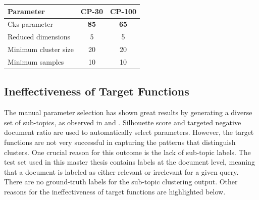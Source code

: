  \begin{center}
 	\label{tab:manual_parameter_selection}
 	\begin{tabularx}{.5\textwidth}{|Y|c|c|}
 		\hline
 		Parameter & CP-30 & CP-100 \\
 		\hline
 		
 		Cks parameter & \textbf{85} &         \textbf{65} \\ \hline
 		Reduced dimensions &  5  &       5 \\ \hline
 		Minimum cluster size & 20 &         20 \\ \hline
 		Minimum samples &    10  &     10 \\ \hline
 		
 	\end{tabularx}
 	
 \end{center}
 
 \subsection{Ineffectiveness of Target Functions}
 
The manual parameter selection has shown great results by generating a diverse set of sub-topics, as observed in  and . Silhouette score and targeted negative document ratio are used to automatically select parameters. However, the target functions are not very successful in capturing the patterns that distinguish clusters. One crucial reason for this outcome is the lack of sub-topic labels. The test set used in this master thesis contains labels at the document level, meaning that a document is labeled as either relevant or irrelevant for a given query. There are no ground-truth labels for the sub-topic clustering output. Other reasons for the ineffectiveness of target functions are highlighted below.
 
